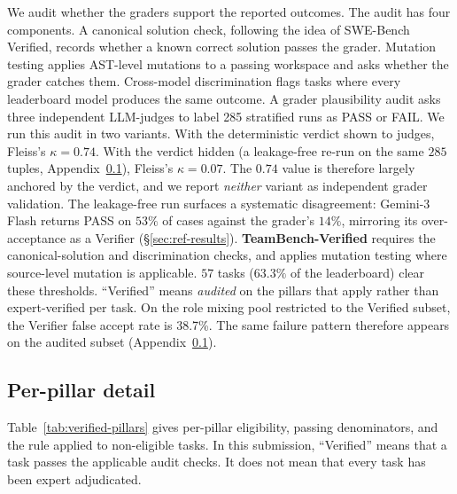 \documentclass{article}
\begin{document}

We audit whether the graders support the reported outcomes. The audit has four components. A canonical solution check, following the idea of SWE-Bench Verified, records whether a known correct solution passes the grader. Mutation testing applies AST-level mutations to a passing workspace and asks whether the grader catches them. Cross-model discrimination flags tasks where every leaderboard model produces the same outcome. A grader plausibility audit asks three independent LLM-judges to label 285 stratified runs as PASS or FAIL. We run this audit in two variants. With the deterministic verdict shown to judges, Fleiss's $\kappa = 0.74$. With the verdict hidden (a leakage-free re-run on the same $285$ tuples, Appendix~\ref{app:verified-detail}), Fleiss's $\kappa = 0.07$. The $0.74$ value is therefore largely anchored by the verdict, and we report \emph{neither} variant as independent grader validation. The leakage-free run surfaces a systematic disagreement: Gemini-3 Flash returns PASS on $53\%$ of cases against the grader's $14\%$, mirroring its over-acceptance as a Verifier (\S\ref{sec:ref-results}). \textbf{TeamBench-Verified} requires the canonical-solution and discrimination checks, and applies mutation testing where source-level mutation is applicable. $57$ tasks ($63.3\%$ of the leaderboard) clear these thresholds. ``Verified'' means \emph{audited} on the pillars that apply rather than expert-verified per task. On the role mixing pool restricted to the Verified subset, the Verifier false accept rate is 38.7\%. The same failure pattern therefore appears on the audited subset (Appendix~\ref{app:verified-detail}).

\subsection{Per-pillar detail}
\label{app:verified-detail}

Table~\ref{tab:verified-pillars} gives per-pillar eligibility, passing denominators, and the rule applied to non-eligible tasks. In this submission, “Verified” means that a task passes the applicable audit checks. It does not mean that every task has been expert adjudicated.
\end{document}
